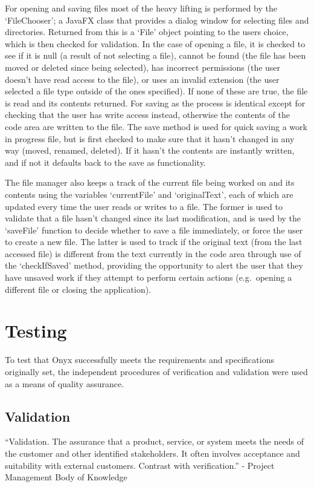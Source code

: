 \documentclass[
]{report}
\begin{document}
For opening and saving files most of the heavy lifting is performed by
the `FileChooser'; a JavaFX class that provides a dialog window for
selecting files and directories. Returned from this is a `File' object
pointing to the users choice, which is then checked for validation. In
the case of opening a file, it is checked to see if it is null (a result
of not selecting a file), cannot be found (the file has been moved or
deleted since being selected), has incorrect permissions (the user
doesn't have read access to the file), or uses an invalid extension (the
user selected a file type outside of the ones specified). If none of
these are true, the file is read and its contents returned. For saving
as the process is identical except for checking that the user has write
access instead, otherwise the contents of the code area are written to
the file. The save method is used for quick saving a work in progress
file, but is first checked to make sure that it hasn't changed in any
way (moved, renamed, deleted). If it hasn't the contents are instantly
written, and if not it defaults back to the save as functionality.

The file manager also keeps a track of the current file being worked on
and its contents using the variables `currentFile' and `originalText',
each of which are updated every time the user reads or writes to a file.
The former is used to validate that a file hasn't changed since its last
modification, and is used by the `saveFile' function to decide whether
to save a file immediately, or force the user to create a new file. The
latter is used to track if the original text (from the last accessed
file) is different from the text currently in the code area through use
of the `checkIfSaved' method, providing the opportunity to alert the
user that they have unsaved work if they attempt to perform certain
actions (e.g.~opening a different file or closing the application).

\chapter{Testing}
To test that Onyx successfully meets the requirements and specifications
originally set, the independent procedures of verification and
validation were used as a means of quality assurance.

\section{Validation}
``Validation. The assurance that a product, service, or system meets the
needs of the customer and other identified stakeholders. It often
involves acceptance and suitability with external customers. Contrast
with verification.'' - Project Management Body of Knowledge \cite{pmbok-book}
\end{document}
